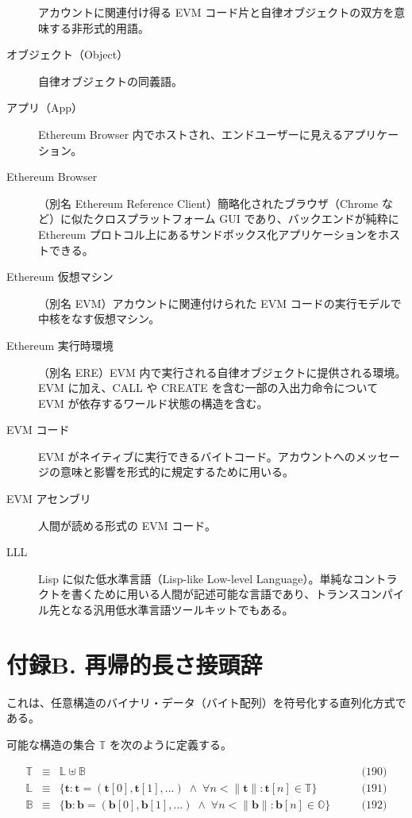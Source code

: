 \documentclass[
]{ltjsarticle}
\begin{document}
\begin{description}
アカウントに関連付け得る EVM
コード片と自律オブジェクトの双方を意味する非形式的用語。
\item[オブジェクト（Object）]
自律オブジェクトの同義語。
\item[アプリ（App）]
Ethereum Browser
内でホストされ、エンドユーザーに見えるアプリケーション。
\item[Ethereum Browser]
（別名 Ethereum Reference Client）簡略化されたブラウザ（Chrome
など）に似たクロスプラットフォーム GUI であり、バックエンドが純粋に
Ethereum
プロトコル上にあるサンドボックス化アプリケーションをホストできる。
\item[Ethereum 仮想マシン]
（別名 EVM）アカウントに関連付けられた EVM
コードの実行モデルで中核をなす仮想マシン。
\item[Ethereum 実行時環境]
（別名 ERE）EVM 内で実行される自律オブジェクトに提供される環境。EVM
に加え、CALL や CREATE を含む一部の入出力命令について EVM
が依存するワールド状態の構造を含む。
\item[EVM コード]
EVM
がネイティブに実行できるバイトコード。アカウントへのメッセージの意味と影響を形式的に規定するために用いる。
\item[EVM アセンブリ]
人間が読める形式の EVM コード。
\item[LLL]
Lisp に似た低水準言語（Lisp-like Low-level
Language）。単純なコントラクトを書くために用いる人間が記述可能な言語であり、トランスコンパイル先となる汎用低水準言語ツールキットでもある。
\end{description}

\protect\hypertarget{app:rlp}{}{}

\hypertarget{ux4ed8ux9332b.-ux518dux5e30ux7684ux9577ux3055ux63a5ux982dux8f9e}{%
\section{付録B.
再帰的長さ接頭辞}\label{ux4ed8ux9332b.-ux518dux5e30ux7684ux9577ux3055ux63a5ux982dux8f9e}}

\hypertarget{rlp}{}

これは、任意構造のバイナリ・データ（バイト配列）を符号化する直列化方式である。

可能な構造の集合 \(\mathbb{T}\) を次のように定義する。

\protect\hypertarget{eq-190}{}{}\protect\hypertarget{eq-191}{}{}\protect\hypertarget{eq-192}{}{}

\[\begin{aligned}
\mathbb{T} & \equiv & \mathbb{L} \uplus \mathbb{B} & \qquad \text{(190)} \\
\mathbb{L} & \equiv & \{ \mathbf{t}: \mathbf{t} = ( \mathbf{t}[0], \mathbf{t}[1], ... ) \; \wedge \; \forall n < \lVert \mathbf{t} \rVert : \mathbf{t}[n] \in \mathbb{T} \} & \qquad \text{(191)} \\
\mathbb{B} & \equiv & \{ \mathbf{b}: \mathbf{b} = ( \mathbf{b}[0], \mathbf{b}[1], ... ) \; \wedge \; \forall n < \lVert \mathbf{b} \rVert : \mathbf{b}[n] \in \mathbb{O} \} & \qquad \text{(192)}
\end{aligned}\]
\end{document}
